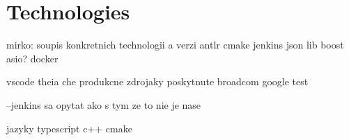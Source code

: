 \chapter{Technologies}

mirko: soupis konkretnich technologii a verzi
antlr
cmake
jenkins
json lib
boost asio?
docker

vscode 
theia
che
produkcne zdrojaky poskytnute broadcom
google test

--jenkins sa opytat ako s tym ze to nie je nase

jazyky
typescript 
c++
cmake
